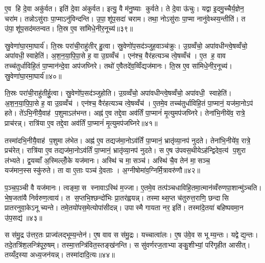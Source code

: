ए॒व हि दे॒वा अकु॑र्वत। इति॑ दे॒वा अ॑कुर्वत। इत्यु॒ वै म॑नु॒ष्याः कुर्वते। ते दे॒वा ऊ॑चुः। यद्वा इ॒दमु॒च्चैर्य॒ज्ञेन॒ चरा॑म। तन्नोऽसु॑राः पा॒प्माऽनु॑विन्दन्ति। उ॒पा॒शू॑प॒सदा॑ चराम। तथा॒ नोऽसु॑राः पा॒प्मा नानु॑वेथ्स्य॒न्तीति॑। त उ॑पा॒शू॑प॒सद॑मतन्वत। ति॒स्र ए॒व सा॑मिधे॒नीर॒नूच्य॑॥३९॥

स्रु॒वेणा॑घा॒रमा॒घार्य॑। ति॒स्रः परा॑ची॒राहु॑तीर् हु॒त्वा। स्रु॒वेणो॑प॒सद॑ञ्जुह॒वाञ्च॑क्रुः। उ॒ग्रव्वँचो॒ अपा॑वधीन्त्वे॒षव्वँचो॒ अपा॑वधी॒स्वाहेति॑। अ॒श॒न॒या॒पि॒पा॒से ह॒ वा उ॒ग्रव्वँच॑। एन॑श्च॒ वैर॑हत्यञ्च त्वे॒षव्वँच॑। ए॒त ह॒ वाव तच्च॑तुर्धाविहि॒तं पा॒प्मान॑न्दे॒वा अप॑जघ्निरे। तथो॑ ए॒वैतदे॑व॒व्विँद्यज॑मानः। ति॒स्र ए॒व सा॑मिधे॒नीर॒नूच्य॑। स्रु॒वेणा॑घा॒रमा॒घार्य॑॥४०॥

ति॒स्रः परा॑ची॒राहु॑तीर्\mbox{}हु॒त्वा। स्रु॒वेणो॑प॒सद॑ञ्जुहोति। उ॒ग्रव्वँचो॒ अपा॑वधीन्त्वे॒षव्वँचो॒ अपा॑वधी॒ स्वाहेति॑। अ॒श॒न॒या॒पि॒पा॒से ह॒ वा उ॒ग्रव्वँच॑। एन॑श्च॒ वैर॑हत्यञ्च त्वे॒षव्वँच॑। ए॒तमे॒व तच्च॑तुर्धाविहि॒तं पा॒प्मानं॒ यज॑मा॒नोऽप॑ हते। ते॑ऽभि॒नीयै॒वाह॑ प॒शुमाऽल॑भन्त। अह्न॑ ए॒व तद्दे॒वा अव॑र्तिं पा॒प्मानं॑ मृ॒त्युमप॑जघ्निरे। तेना॑भि॒नीये॑व॒ रात्रे॒ प्राच॑रन्न्। रात्रि॑या ए॒व तद्दे॒वा अव॑र्तिं पा॒प्मानं॑ मृ॒त्युमप॑जघ्निरे॥४१॥

तस्मा॑दभि॒नीयै॒वाह॑ प॒शुमा ल॑भेत। अह्न॑ ए॒व तद्यज॑मा॒नोऽव॑र्तिं पा॒प्मानं॒ भ्रातृ॑व्या॒नप॑ नुदते। तेना॑भि॒नीये॑व॒ रात्रे॒ प्रच॑रेत्। रात्रि॑या ए॒व तद्यज॑मा॒नोऽव॑र्तिं पा॒प्मानं॒ भ्रातृ॑व्या॒नप॑ नुदते। स ए॒ष उ॑पवस॒थीयेऽह॑न्द्विदेव॒त्य॑ प॒शुरा ल॑भ्यते। द्व॒यव्वाँ अ॒स्मिल्लोँ॒के यज॑मानः। अस्थि॑ च मा॒सञ्च॑। अस्थि॑ चै॒व तेन॑ मा॒सञ्च॒ यज॑मान॒स्सस्कु॑रुते। ता वा ए॒ताः पञ्च॑ दे॒वताः। अ॒ग्नीषोमा॑व॒ग्निर्मि॒त्रावरु॑णौ॥४२॥

प॒ञ्च॒प॒ञ्ची वै यज॑मानः। त्वङ्मा॒स स्नावाऽस्थि॑ म॒ज्जा। ए॒तमे॒व तत्प॑ञ्चधाविहि॒तमा॒त्मान॑व्वँरुणपा॒शान्मु॑ञ्चति। भे॒ष॒जता॑यै निर्वरुण॒त्वाय॑। त स॒प्तभि॒श्छन्दो॑भिः प्रा॒तर॑ह्वयन्न्। तस्माथ्स॒प्त च॑तुरुत्त॒राणि॒ छन्दासि प्रातरनुवा॒केऽनूच्यन्ते। तमे॒तयो॑पस॒मेत्योपा॑सीदन्न्। उपास्मै गायता नर॒ इति॑। तस्मा॑दे॒तया॑ बहिष्पवमा॒न उ॑प॒सद्य॑॥४३॥\anuvakamend[ऐ॒च्छ॒न्न॒न॒य॒स्ति॒ष्ठ॒न्ते॒ऽनूच्या॒नूच्य॑ स्रु॒वेणा॑घा॒रमा॒घार्य॒ रात्रि॑या ए॒व तद्दे॒वा अव॑र्तिं पा॒प्मानं॑ मृ॒त्युमप॑जिघ्निरे मि॒त्रावरु॑णौ॒ नव॑ च (दे॒वा यज॑मानो दे॒वा दे॒वा यज॑मानो॒ यज॑मानोऽलभन्त॒ प्राच॑रल्लँभेत॒ प्रच॑रे॒दाल॑भ॒न्ताल॑भेत मृ॒त्युमप॑जघ्निरे॒ भ्रातृ॑व्यान्॥)]

स स॑मु॒द्र उ॑त्तर॒तः प्राज्व॑लद्भूम्य॒न्तेन॑। ए॒ष वाव स स॑मु॒द्रः। यच्चात्वा॑लः। ए॒ष उ॑वे॒व स भूम्य॒न्तः। यद्वेद्य॒न्तः। तदे॒तत्रि॑श॒लन्त्रि॑पूरु॒षम्। तस्मा॒त्तन्त्रि॑वित॒स्तङ्ख॑नन्ति। स सु॑वर्णरज॒ताभ्याङ्कु॒शीभ्यां॒ परि॑गृहीत आसीत्। तय्यँद॒स्या अध्य॒जन॑यन्न्। तस्मा॑दादि॒त्यः॥४४॥

